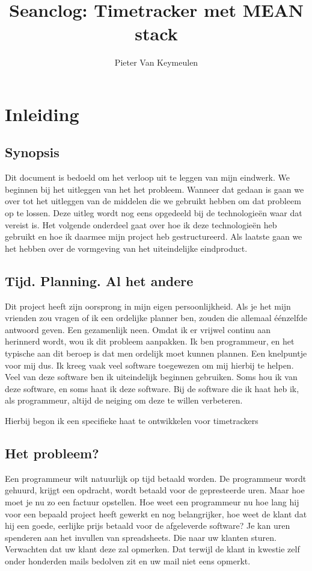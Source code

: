 \documentclass[a4paper,11pt]{article}
\begin{document}
\title{Seanclog: Timetracker met MEAN stack}
\author{Pieter Van Keymeulen}
\maketitle
\newpage
\tableofcontents
\newpage
\section{Inleiding}


\subsection{Synopsis}
Dit document is bedoeld om het verloop uit te leggen van mijn eindwerk. We beginnen bij het uitleggen van het het probleem. Wanneer dat gedaan is gaan we over tot het uitleggen van de middelen die we gebruikt hebben om dat probleem op te lossen. Deze uitleg wordt nog eens opgedeeld bij de technologieën waar dat vereist is. Het volgende onderdeel gaat over hoe ik deze technologieën heb gebruikt en hoe ik daarmee mijn project heb gestructureerd. Als laatste gaan we het hebben over de vormgeving van het uiteindelijke eindproduct.

\subsection{Tijd. Planning. Al het andere}
Dit project heeft zijn oorsprong in mijn eigen persoonlijkheid. Als je het mijn
vrienden zou vragen of ik een ordelijke planner ben, zouden die allemaal
éénzelfde antwoord geven. Een gezamenlijk neen. Omdat ik er vrijwel continu aan
herinnerd wordt, wou ik dit probleem aanpakken. Ik ben programmeur, en het
typische aan dit beroep is dat men ordelijk moet kunnen plannen. Een knelpuntje
voor mij dus. Ik kreeg vaak veel software toegewezen om mij hierbij te helpen.
Veel van deze software ben ik uiteindelijk beginnen gebruiken. Soms hou ik van
deze software, en soms haat ik deze software. Bij de software die ik haat heb
ik, als programmeur, altijd de neiging om deze te willen verbeteren.

Hierbij begon ik een specifieke haat te ontwikkelen voor timetrackers

\subsection{Het probleem?}
Een programmeur wilt natuurlijk op tijd betaald worden. De programmeur wordt
gehuurd, krijgt een opdracht, wordt betaald voor de gepresteerde uren. Maar hoe
moet je nu zo een factuur opstellen. Hoe weet een programmeur nu hoe lang hij
voor een bepaald project heeft gewerkt en nog belangrijker, hoe weet de klant
dat hij een goede, eerlijke prijs betaald voor de afgeleverde software? Je kan
uren spenderen aan het invullen van spreadsheets. Die naar uw klanten sturen.
Verwachten dat uw klant deze zal opmerken. Dat terwijl de klant in kwestie zelf
onder honderden mails bedolven zit en uw mail niet eens opmerkt.
\end{document}
